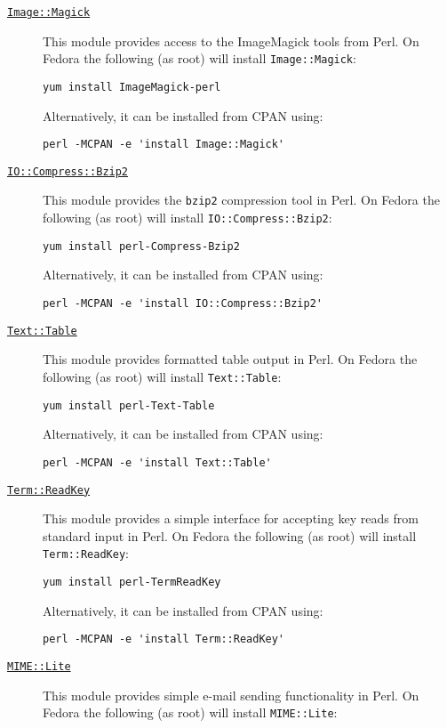 \begin{description}
\begin{description}
  \item [\href{http://search.cpan.org/~jcristy/PerlMagick-6.59/Magick.pm}{{\tt Image::Magick}}] This module provides access to the {\sc ImageMagick} tools from Perl. On Fedora the following (as root) will install {\tt Image::Magick}:
\begin{verbatim}
yum install ImageMagick-perl
\end{verbatim}
Alternatively, it can be installed from CPAN using:
\begin{verbatim}
perl -MCPAN -e 'install Image::Magick'
\end{verbatim}
  \item [\href{http://perldoc.perl.org/IO/Compress/Bzip2.html}{{\tt IO::Compress::Bzip2}}] This module provides the {\tt bzip2} compression tool in Perl. On Fedora the following (as root) will install {\tt IO::Compress::Bzip2}:
\begin{verbatim}
yum install perl-Compress-Bzip2
\end{verbatim}
Alternatively, it can be installed from CPAN using:
\begin{verbatim}
perl -MCPAN -e 'install IO::Compress::Bzip2'
\end{verbatim}
  \item [\href{http://search.cpan.org/~anno/Text-Table-1.114/lib/Text/Table.pm}{{\tt Text::Table}}] This module provides formatted table output in Perl. On Fedora the following (as root) will install {\tt Text::Table}:
\begin{verbatim}
yum install perl-Text-Table
\end{verbatim}
Alternatively, it can be installed from CPAN using:
\begin{verbatim}
perl -MCPAN -e 'install Text::Table'
\end{verbatim}
  \item [\href{http://search.cpan.org/dist/TermReadKey/ReadKey.pm}{{\tt Term::ReadKey}}] This module provides a simple interface for accepting key reads from standard input in Perl. On Fedora the following (as root) will install {\tt Term::ReadKey}:
\begin{verbatim}
yum install perl-TermReadKey
\end{verbatim}
Alternatively, it can be installed from CPAN using:
\begin{verbatim}
perl -MCPAN -e 'install Term::ReadKey'
\end{verbatim}
  \item [\href{http://search.cpan.org/~rjbs/MIME-Lite-3.027/lib/MIME/Lite.pm}{{\tt MIME::Lite}}] This module provides simple e-mail sending functionality in Perl. On Fedora the following (as root) will install {\tt MIME::Lite}:

\end{description}
\end{description}

